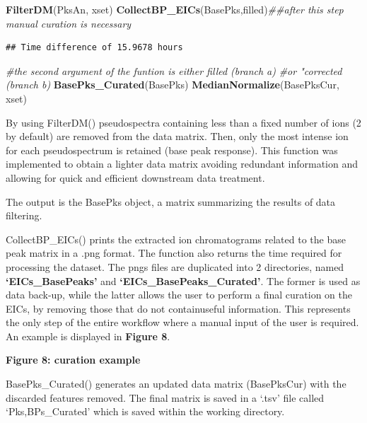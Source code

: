 \documentclass[
]{article}
\newenvironment{Shaded}{\begin{snugshade}}{\end{snugshade}}
\newcommand{\CommentTok}[1]{\textcolor[rgb]{0.56,0.35,0.01}{\textit{#1}}}
\newcommand{\KeywordTok}[1]{\textcolor[rgb]{0.13,0.29,0.53}{\textbf{#1}}}
\newcommand{\NormalTok}[1]{#1}
\newcommand{\StringTok}[1]{\textcolor[rgb]{0.31,0.60,0.02}{#1}}
\begin{document}
\begin{Shaded}
\begin{Highlighting}[]
\KeywordTok{FilterDM}\NormalTok{(PksAn, xset)}
\KeywordTok{CollectBP\_EICs}\NormalTok{(BasePks,}\StringTok{\textquotesingle{}filled\textquotesingle{}}\NormalTok{)}\CommentTok{\#\#after this step manual curation is necessary }
\end{Highlighting}
\end{Shaded}

\begin{verbatim}
## Time difference of 15.9678 hours
\end{verbatim}

\begin{Shaded}
\begin{Highlighting}[]
\CommentTok{\#the second argument of the funtion is either \textquotesingle{}filled\textquotesingle{} (branch a)}
\CommentTok{\#or "corrected\textquotesingle{} (branch b)}
\KeywordTok{BasePks\_Curated}\NormalTok{(BasePks)}
\KeywordTok{MedianNormalize}\NormalTok{(BasePksCur, xset)}
\end{Highlighting}
\end{Shaded}

By using FilterDM() pseudospectra containing less than a fixed number of
ions (2 by default) are removed from the data matrix. Then, only the
most intense ion for each pseudospectrum is retained (base peak
response). This function was implemented to obtain a lighter data matrix
avoiding redundant information and allowing for quick and efficient
downstream data treatment.

The output is the BasePks object, a matrix summarizing the results of
data filtering.

CollectBP\_EICs() prints the extracted ion chromatograms related to the
base peak matrix in a .png format. The function also returns the time
required for processing the dataset. The pngs files are duplicated into
2 directories, named \textbf{`EICs\_BasePeaks'} and
\textbf{`EICs\_BasePeaks\_Curated'}. The former is used as data back-up,
while the latter allows the user to perform a final curation on the
EICs, by removing those that do not containuseful information. This
represents the only step of the entire workflow where a manual input of
the user is required. An example is displayed in \textbf{Figure 8}.

\textbf{Figure 8: curation example }

BasePks\_Curated() generates an updated data matrix (BasePksCur) with
the discarded features removed. The final matrix is saved in a `.tsv'
file called `Pks,BPs\_Curated' which is saved within the working
directory.
\end{document}

